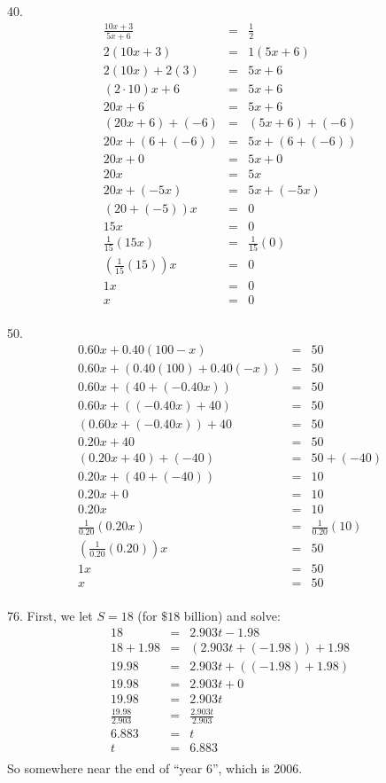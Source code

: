 \documentclass[letterpaper]{article}
\begin{document}
40.
\begin{eqnarray*}
\frac{10x+3}{5x+6} &=& \frac{1}{2} \\
2(10x+3) &=& 1(5x+6) \\
2(10x)+2(3) &=& 5x+6 \\
(2\cdot10)x+6 &=& 5x+6 \\
20x+6 &=& 5x+6 \\
(20x+6)+(-6) &=& (5x+6)+(-6) \\
20x+(6+(-6)) &=& 5x+(6+(-6)) \\
20x+0 &=& 5x+0 \\
20x &=& 5x \\
20x+(-5x) &=& 5x+(-5x) \\
(20+(-5))x &=& 0 \\
15x &=& 0 \\
\frac{1}{15}(15x) &=& \frac{1}{15}(0) \\
(\frac{1}{15}(15))x &=& 0 \\
1x &=& 0 \\
x &=& 0 \\
\end{eqnarray*}

50.
\begin{eqnarray*}
0.60x+0.40(100-x) &=& 50 \\
0.60x+(0.40(100)+0.40(-x)) &=& 50 \\
0.60x+(40+(-0.40x)) &=& 50 \\
0.60x+((-0.40x)+40) &=& 50 \\
(0.60x+(-0.40x))+40 &=& 50 \\
0.20x+40 &=& 50 \\
(0.20x+40)+(-40) &=& 50+(-40) \\
0.20x+(40+(-40)) &=& 10 \\
0.20x+0 &=& 10 \\
0.20x &=& 10 \\
\frac{1}{0.20}(0.20x) &=& \frac{1}{0.20}(10) \\
(\frac{1}{0.20}(0.20))x &=& 50 \\
1x &=& 50 \\
x &=& 50 \\
\end{eqnarray*}

76. First, we let $S=18$ (for $\$18$ billion) and solve:
\begin{eqnarray*}
18 &=& 2.903t-1.98 \\
18+1.98 &=& (2.903t+(-1.98))+1.98 \\
19.98 &=& 2.903t+((-1.98)+1.98) \\
19.98 &=& 2.903t+0 \\
19.98 &=& 2.903t \\
\frac{19.98}{2.903} &=& \frac{2.903t}{2.903} \\
6.883 &=& t \\
t &=& 6.883 \\
\end{eqnarray*}
So somewhere near the end of ``year 6'', which is 2006.
\end{document}
